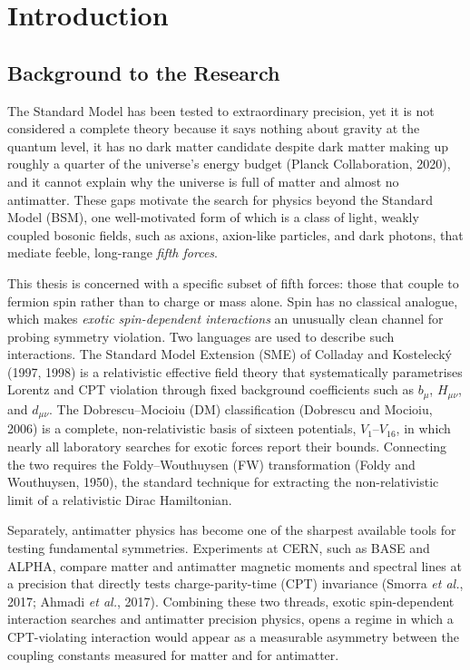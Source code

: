 \chapter{Introduction}
\label{ch:introduction}

\section{Background to the Research}

The Standard Model has been tested to extraordinary precision, yet it is
not considered a complete theory because it says nothing about gravity at the quantum level,
it has no dark matter candidate despite dark matter making up roughly a
quarter of the universe's energy budget (Planck Collaboration, 2020), and
it cannot explain why the universe is full of matter and almost no
antimatter. These gaps motivate the search for physics beyond the Standard
Model (BSM), one well-motivated form of which is a class of light, weakly
coupled bosonic fields, such as axions, axion-like particles, and dark
photons, that mediate feeble, long-range \emph{fifth forces}.

This thesis is concerned with a specific subset of fifth forces: those that
couple to fermion spin rather than to charge or mass alone. Spin has no
classical analogue, which makes \emph{exotic spin-dependent interactions}
an unusually clean channel for probing symmetry violation. Two languages
are used to describe such interactions. The Standard Model Extension (SME)
of Colladay and Kostelecký (1997, 1998) is a relativistic effective field
theory that systematically parametrises Lorentz and CPT violation through
fixed background coefficients such as $b_\mu$, $H_{\mu\nu}$, and
$d_{\mu\nu}$. The Dobrescu--Mocioiu (DM) classification (Dobrescu and
Mocioiu, 2006) is a complete, non-relativistic basis of sixteen potentials,
$V_1$--$V_{16}$, in which nearly all laboratory searches for exotic forces
report their bounds. Connecting the two requires the Foldy--Wouthuysen (FW)
transformation (Foldy and Wouthuysen, 1950), the standard technique for
extracting the non-relativistic limit of a relativistic Dirac Hamiltonian.

Separately, antimatter physics has become one of the sharpest available
tools for testing fundamental symmetries. Experiments at CERN, such as BASE
and ALPHA, compare matter and antimatter magnetic moments and spectral
lines at a precision that directly tests charge-parity-time (CPT)
invariance (Smorra \textit{et al.}, 2017; Ahmadi \textit{et al.}, 2017).
Combining these two threads, exotic spin-dependent interaction searches and
antimatter precision physics, opens a regime in which a CPT-violating
interaction would appear as a measurable asymmetry between the coupling
constants measured for matter and for antimatter.

